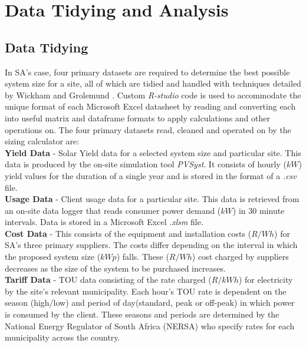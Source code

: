 \documentclass[a4paper,11pt,fleqn]{report}
\begin{document}
\chapter{Data Tidying and Analysis} \label{chp: 3 Data Analysis}
\section{Data Tidying} \label{sec: Data Tidying}
In \ac{SA}'s case, four primary datasets are required to determine the best possible system size for a site, all of which are tidied and handled with techniques detailed by Wickham and Grolemund \citep{Grol2017}. Custom \textit{R-studio} code is used to accommodate the unique format of each Microsoft Excel datasheet by reading and converting each into useful matrix and dataframe formats to apply calculations and other operations on. The four primary datasets read, cleaned and operated on by the sizing calculator are: \\

\noindent\textbf{Yield Data} - Solar Yield data for a selected system size and particular site. This data is produced by the on-site simulation tool \textit{PVSyst}. It consists of hourly ($kW$) yield values for the duration of a single year and is stored in the format of a \textit{.csv} file.\\

\noindent\textbf{Usage Data} - Client usage data for a particular site. This data is retrieved from an on-site data logger that reads consumer power demand ($kW$) in 30 minute intervals. Data is stored in a Microsoft Excel .\textit{xlsm} file.\\

\noindent\textbf{Cost Data} - This consists of the equipment and installation costs ($R/Wh$) for \ac{SA}'s three primary suppliers. The costs differ depending on the interval in which the proposed system size ($kWp$) falls. These ($R/Wh$) cost charged by suppliers decreases as the size of the system to be purchased increases.\\

\noindent\textbf{Tariff Data} - \ac{TOU} data consisting of the rate charged ($R/kWh$) for electricity by the site's relevant municipality. Each hour's \ac{TOU} rate is dependent on the season (high/low) and period of day(standard, peak or off-peak) in which power is consumed by the client. These seasons and periods are determined by the National Energy Regulator of South Africa (NERSA) who specify rates for each municipality across the country.\\
\end{document}
